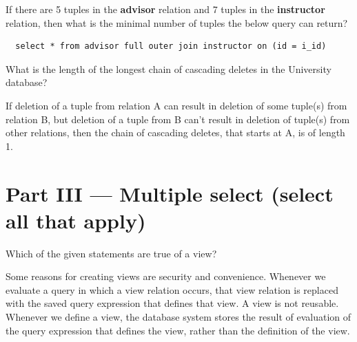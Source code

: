 \documentclass[12pt, addpoints, answers]{exam}
\begin{document}
\begin{questions}
\begin{minipage}{\linewidth}
\question[2]
If there are 5 tuples in the \textbf{advisor} relation and 7 tuples in the \textbf{instructor} relation, 
then what is the minimal number of tuples the below query can return?\par\vspace{0.5em}
\begin{verbatim} 
  select * from advisor full outer join instructor on (id = i_id)
\end{verbatim}
\begin{checkboxes}
\end{checkboxes}
\end{minipage}\vspace{1em}

\begin{minipage}{\linewidth}
\question[3]
What is the length of the longest chain of cascading deletes in the University database?\par\vspace{0.5em}
If deletion of a tuple from relation A can result in deletion of some tuple(s) from relation B, 
but deletion of a tuple from B can't result in deletion of tuple(s) from other relations, then the chain of cascading deletes, 
that starts at A, is of length 1.\par\vspace{0.5em}
\begin{checkboxes}
\end{checkboxes}
\end{minipage}\vspace{1em}

\section*{Part III — Multiple select (select all that apply)}

\begin{minipage}{\linewidth}
\question[4]
Which of the given statements are true of a view?\par\vspace{0.5em}
\begin{checkboxes}
    \CorrectChoice Some reasons for creating views are security and convenience.
    \CorrectChoice Whenever we evaluate a query in which a view relation occurs, that view relation is replaced 
    with the saved query expression that defines that view.
    \choice A view is not reusable.
    \choice Whenever we define a view, the database system stores the result of evaluation of the query 
    expression that defines the view, rather than the definition of the view.
\end{checkboxes}
\end{minipage}\vspace{1em}

\end{questions}
\end{document}
